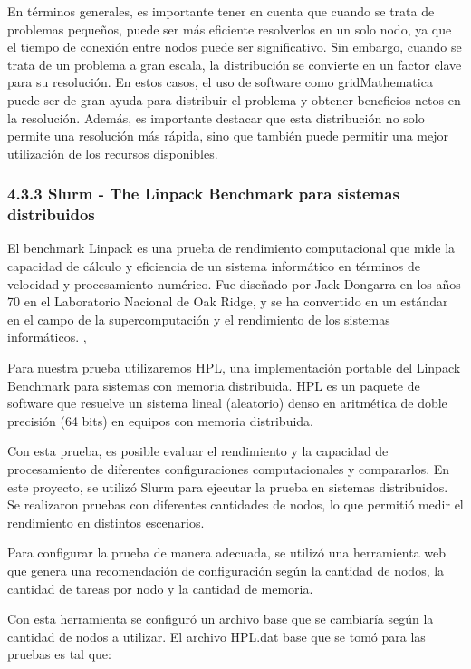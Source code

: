 \begin{spacing}{1.5}
      En términos generales, es importante tener en cuenta que cuando se trata de problemas pequeños, puede ser más eficiente resolverlos en un solo nodo, ya que el tiempo de conexión entre nodos puede ser significativo. Sin embargo, cuando se trata de un problema a gran escala, la distribución se convierte en un factor clave para su resolución. En estos casos, el uso de software como gridMathematica puede ser de gran ayuda para distribuir el problema y obtener beneficios netos en la resolución. Además, es importante destacar que esta distribución no solo permite una resolución más rápida, sino que también puede permitir una mejor utilización de los recursos disponibles.

\subsubsection{4.3.3 Slurm - The Linpack Benchmark para sistemas distribuidos}

El benchmark Linpack es una prueba de rendimiento computacional que mide la capacidad de cálculo y eficiencia de un sistema informático en términos de velocidad y procesamiento numérico. Fue diseñado por Jack Dongarra en los años 70 en el Laboratorio Nacional de Oak Ridge, y se ha convertido en un estándar en el campo de la supercomputación y el rendimiento de los sistemas informáticos. \cite{linpack},  \cite{faq-linpack}

Para nuestra prueba utilizaremos HPL, una implementación portable del Linpack Benchmark para sistemas con memoria distribuida. HPL es un paquete de software que resuelve un sistema lineal (aleatorio) denso en aritmética de doble precisión (64 bits) en equipos con memoria distribuida.\cite{hpl-linpack}

Con esta prueba, es posible evaluar el rendimiento y la capacidad de procesamiento de diferentes configuraciones computacionales y compararlos. En este proyecto, se utilizó Slurm para ejecutar la prueba en sistemas distribuidos. Se realizaron pruebas con diferentes cantidades de nodos, lo que permitió medir el rendimiento en distintos escenarios.

Para configurar la prueba de manera adecuada, se utilizó una herramienta web que genera una recomendación de configuración según la cantidad de nodos, la cantidad de tareas por nodo y la cantidad de memoria.\cite{tune-hpl-dat-file}

Con esta herramienta se configuró un archivo base que se cambiaría según la cantidad de nodos a utilizar. El archivo HPL.dat base que se tomó para las pruebas es tal que:


\end{spacing}
